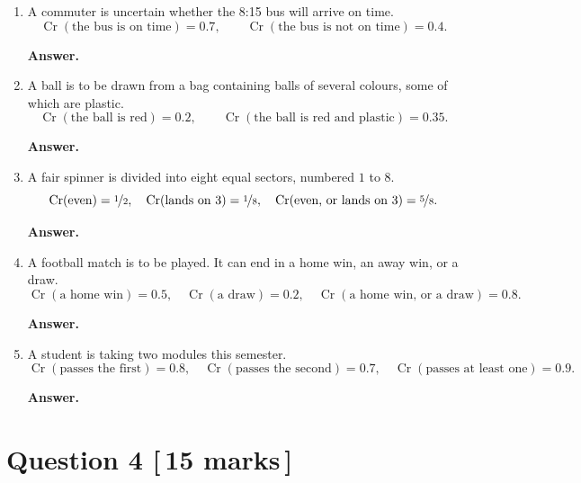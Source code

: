 \documentclass[11pt]{article}
\theoremstyle{definition}
\DeclareMathOperator{\Cr}{Cr}
\newenvironment{answer}
  {\par\medskip\noindent\textbf{Answer.}\par\nobreak\smallskip\ignorespaces}
  {\par\medskip}
\begin{document}
\begin{enumerate}[label=(\alph*)]

\item A commuter is uncertain whether the 8:15 bus will arrive on time.
\[
	\Cr(\text{the bus is on time}) = 0.7,
	\qquad
	\Cr(\text{the bus is not on time}) = 0.4.
\]
\begin{answer}
\end{answer}

\item A ball is to be drawn from a bag containing balls of several colours, some
of which are plastic.
\[
	\Cr(\text{the ball is red}) = 0.2,
	\qquad
	\Cr(\text{the ball is red and plastic}) = 0.35.
\]
\begin{answer}
\end{answer}

\item A fair spinner is divided into eight equal sectors, numbered $1$ to $8$.
\[
	\Cr(\text{even}) = \nicefrac{1}{2},
	\quad
	\Cr(\text{lands on } 3) = \nicefrac{1}{8},
	\quad
	\Cr(\text{even, or lands on } 3) = \nicefrac{5}{8}.
\]
\begin{answer}
\end{answer}

\item A football match is to be played. It can end in a home win, an away win,
or a draw.
\[
	\Cr(\text{a home win}) = 0.5,
	\quad
	\Cr(\text{a draw}) = 0.2,
	\quad
	\Cr(\text{a home win, or a draw}) = 0.8.
\]
\begin{answer}
\end{answer}

\item A student is taking two modules this semester.
\[
	\Cr(\text{passes the first}) = 0.8,
	\quad
	\Cr(\text{passes the second}) = 0.7,
	\quad
	\Cr(\text{passes at least one}) = 0.9.
\]
\begin{answer}
\end{answer}

\end{enumerate}

\section*{Question 4 \hfill \normalsize [\,15 marks\,]}
\end{document}
